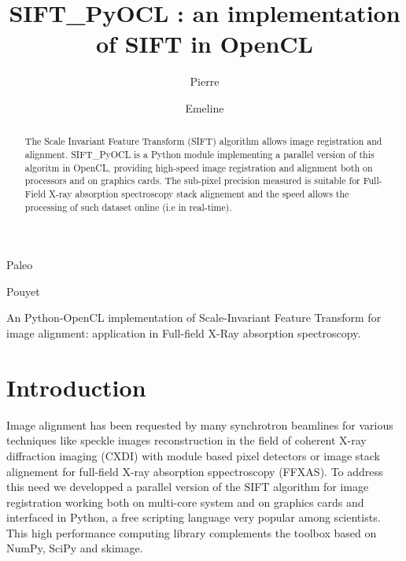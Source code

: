 \documentclass[preprint]{iucr}
\begin{document}
\title{SIFT\_PyOCL : an implementation of SIFT in OpenCL}

    \author[a]{Pierre}{Paleo}
    \author[a]{Emeline}{Pouyet}

\maketitle

\begin{synopsis}
An Python-OpenCL implementation of Scale-Invariant Feature Transform for image
alignment: application in Full-field X-Ray absorption spectroscopy.
\end{synopsis}

\begin{abstract}
The Scale Invariant Feature Transform (SIFT) algorithm allows image registration and alignment.
SIFT\_PyOCL is a Python module implementing a parallel version of this algoritm in OpenCL,
providing high-speed image registration and alignment both on processors and on graphics cards.
The sub-pixel precision measured is suitable for Full-Field X-ray
absorption spectroscopy stack alignement and the speed allows the processing of
such dataset online (i.e in real-time).

\end{abstract}

\section{Introduction}

Image alignment has been requested by many synchrotron beamlines for
various techniques like speckle images reconstruction in the field of coherent
X-ray diffraction imaging (CXDI) with module based pixel detectors or image
stack alignement for full-field X-ray absorption sppectroscopy (FFXAS).
To address this need we developped a parallel
version of the SIFT algorithm for image registration working both on multi-core
system and on graphics cards and interfaced in Python, a free scripting language
very popular among scientists. This high performance computing library complements
the toolbox based on NumPy\cite{numpy}, SciPy\cite{scipy} and
skimage\cite{skimage}.
\end{document}
